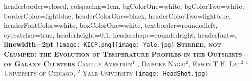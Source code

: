 \documentclass[landscape,a0paper,fontscale=0.285]{baposter} %
\begin{document}
\begin{poster}
{
headerborder=closed, %
colspacing=1em, %
bgColorOne=white, %
bgColorTwo=white, %
borderColor=lightblue, %
headerColorOne=black, %
headerColorTwo=lightblue, %
headerFontColor=white, %
boxColorOne=white, %
textborder=roundedleft, %
eyecatcher=true, %
headerheight=0.1\textheight, %
headershape=roundedright, %
headerfont=\LARGE\bf\textsc, %
linewidth=2pt %
}
%
{\texttt{[image: KICP.png]}\texttt{[image: Yale.jpg]}} %
{\bf\textsc{Stirred, not Clumped: the Evolution of Temperature Profiles in the Outskirts of Galaxy Clusters}\vspace{0.5em}} %
{\textsc{ {\Large Camille Avestruz$^{1}$ , Daisuke Nagai$^2$, Erwin T.H. Lau$^2$}  \hspace{10pt} {\large $^1$University of Chicago, $^2$ Yale University}}} %
{\texttt{[image: HeadShot.jpg]}} %



\end{poster}
\end{document}
